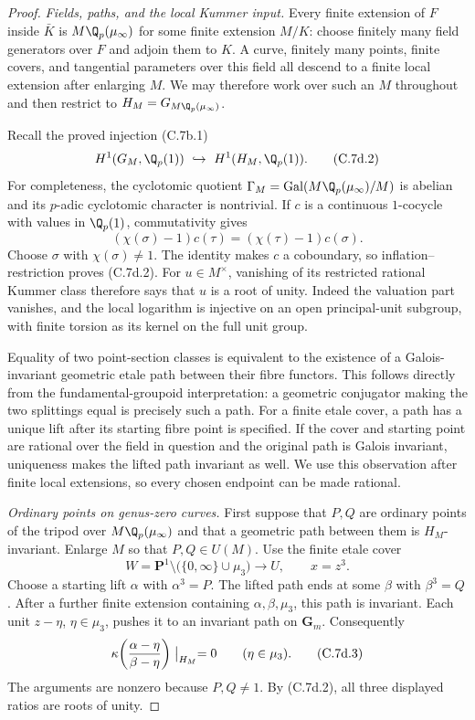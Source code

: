 \begin{proof}
\emph{Fields, paths, and the local Kummer input.}
Every finite extension of $F$ inside $\bar K$ is $M\Q_p(\mu_\infty)$
for some finite extension $M/K$: choose finitely many field generators
over $F$ and adjoin them to $K$. A curve, finitely many points, finite
covers, and tangential parameters over this field all descend to a
finite local extension after enlarging $M$. We may therefore work
over such an $M$ throughout and then restrict to
$H_M=G_{M\Q_p(\mu_\infty)}$.

Recall the proved injection (C.7b.1)
\[
 H^1(G_M,\Q_p(1))\ \hookrightarrow\ H^1(H_M,\Q_p(1)).
                                                               \tag{C.7d.2}
\]
For completeness, the cyclotomic quotient
$\Gamma_M=\operatorname{Gal}(M\Q_p(\mu_\infty)/M)$ is abelian
and its $p$-adic cyclotomic character is nontrivial. If $c$ is a
continuous $1$-cocycle with values in $\Q_p(1)$, commutativity gives
\[
  (\chi(\sigma)-1)c(\tau)=(\chi(\tau)-1)c(\sigma).
\]
Choose $\sigma$ with $\chi(\sigma)\ne1$. The identity makes $c$ a
coboundary, so inflation--restriction proves (C.7d.2).
For $u\in M^\times$, vanishing of its restricted rational Kummer class
therefore says that $u$ is a root of unity. Indeed the valuation part
vanishes, and the local logarithm is injective on an open principal-unit
subgroup, with finite torsion as its kernel on the full unit group.

Equality of two point-section classes is equivalent to the existence
of a Galois-invariant geometric etale path between their fibre functors.
This follows directly from the fundamental-groupoid interpretation:
a geometric conjugator making the two splittings equal is precisely
such a path. For a finite etale cover, a path has a unique lift after
its starting fibre point is specified. If the cover and starting point
are rational over the field in question and the original path is
Galois invariant, uniqueness makes the lifted path invariant as well.
We use this observation after finite local extensions, so every chosen
endpoint can be made rational.

\emph{Ordinary points on genus-zero curves.}
First suppose that $P,Q$ are ordinary points of the tripod over
$M\Q_p(\mu_\infty)$ and that a geometric path between them is
$H_M$-invariant. Enlarge $M$ so that $P,Q\in U(M)$.
Use the finite etale cover
\[
 W=\mathbf P^1\setminus
          \bigl(\{0,\infty\}\cup\mu_3\bigr)\longrightarrow U,
                  \qquad x=z^3.
\]
Choose a starting lift $\alpha$ with $\alpha^3=P$.
The lifted path ends at some $\beta$ with $\beta^3=Q$.
After a further finite extension containing $\alpha,\beta,\mu_3$,
this path is invariant. Each unit $z-\eta$, $\eta\in\mu_3$, pushes
it to an invariant path on $\mathbf G_m$. Consequently
\[
       \kappa\!\left(\frac{\alpha-\eta}{\beta-\eta}\right)
                         \bigm|_{H_M}=0
                 \qquad(\eta\in\mu_3).                       \tag{C.7d.3}
\]
The arguments are nonzero because $P,Q\ne1$.
By (C.7d.2), all three displayed ratios are roots of unity.


\end{proof}
